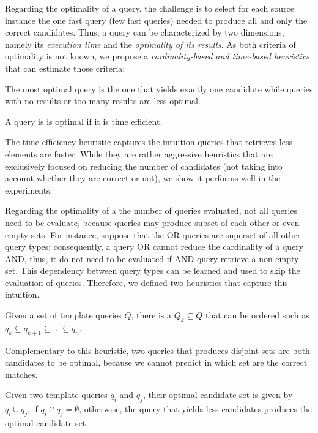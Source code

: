 Regarding the optimality of a query, the challenge is to select for each source instance the one fast query (few fast queries) needed to produce all and only the correct candidates. Thus, a query can be characterized by two dimensions, namely its \emph{execution time} and the \emph{optimality of its results}. As both criteria of optimality is not known, we propose a \emph{cardinality-based and time-based heuristics} that can estimate those criteria:

\begin{definition} The most optimal query is the one that yields exactly one candidate while queries with no results or too many results are less optimal. 
\end{definition} 
\begin{definition} A query is is optimal if it is time efficient.
\end{definition} 
The time efficiency heuristic captures the intuition queries that retrieves less elements are faster. While they are rather aggressive heuristics that are exclusively focused on reducing the number of candidates (not taking into account whether they are correct or not), we show it performs well in the experiments. 

Regarding the optimality of a the number of queries evaluated, not all queries need to be evaluate, because queries may produce subset of each other or even empty sets. For instance, suppose that the OR queries are superset of all other query types; consequently, a query OR cannot reduce the cardinality of a query AND, thus, it do not need to be evaluated if AND query retrieve a non-empty set. This dependency between query types can be learned and used to skip the evaluation of queries. Therefore, we defined two heuristics that capture this intuition.

\begin{definition} Given a set of template queries $Q$, there is a $Q_k \subseteq Q$ that can be ordered such as $q_k \subseteq q_{k+1} \subseteq ... \subseteq q_{n}$.
\end{definition}    

Complementary to this heuristic, two queries that produces disjoint sets are both candidates to be optimal, because we cannot predict in which set are the correct matches.

\begin{definition} Given two template queries $q_i$ and $q_j$, their optimal candidate set is given by $q_i \cup q_j$, if $q_i \cap q_j = \emptyset$, otherwise, the query that yields less candidates produces the optimal candidate set.
\end{definition}  

